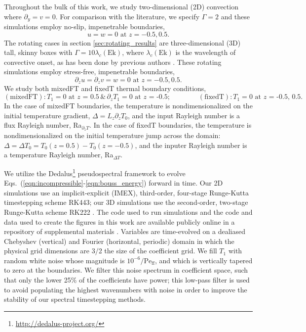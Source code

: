 \documentclass[aps, pre, onecolumn, nofootinbib, notitlepage, groupedaddress, amsfonts, amssymb, amsmath, longbibliography]{revtex4-1}
\newcommand{\Peff}{\ensuremath{\text{Pe}_{\text{ff}}}}
\begin{document}
Throughout the bulk of this work, we study two-dimensional (2D) convection where $\partial_y = v = 0$.
For comparison with the literature, we specify $\Gamma = 2$ and these simulations employ no-slip, impenetrable boundaries,
\begin{equation}
u = w = 0 \, \, \text{at}\,\,z = -0.5, 0.5.
\label{eqn:vel_bcs}
\end{equation}
The rotating cases in section \ref{sec:rotating_results} are three-dimensional (3D) tall, skinny boxes with $\Gamma = 10\lambda_c(\text{Ek})$, where $\lambda_c(\text{Ek})$ is the wavelength of convective onset, as has been done by previous authors \cite{stellmach&all2014}. 
These rotating simulations employ stress-free, impenetrable boundaries,
\begin{equation}
\partial_z u = \partial_z v = w = 0 \, \, \text{at}\,\,z = -0.5, 0.5.
\label{eqn:vel_bcs}
\end{equation}
We study both mixedFT and fixedT thermal boundary conditions,
\begin{equation}
(\text{mixedFT}): T_1 = 0 \text{ at $z$ = 0.5} \,\&\, \partial_z T_1 = 0 \text{ at $z$ = -0.5};\qquad\qquad
(\text{fixedT}): T_1 = 0 \text{ at $z$ = -0.5, 0.5}.
\end{equation}
In the case of mixedFT boundaries, the temperature is nondimensionalized on the initial temperature gradient, $\Delta = L_z \partial_z T_0$, and the input Rayleigh number is a flux Rayleigh number, Ra$_{\partial_z T}$.
In the case of fixedT boundaries, the temperature is nondimensionalized on the initial temperature jump across the domain: $\Delta = \Delta T_0 =  T_0(z=0.5)-T_0(z=-0.5)$, and the inputer Rayleigh number is a temperature Rayleigh number, Ra$_{\Delta T}$.

We utilize the Dedalus\footnote{\url{http://dedalus-project.org/}} pseudospectral framework \cite{burns&all2016, burns&all2019} to evolve Eqs.~(\ref{eqn:incompressible}-\ref{eqn:bouss_energy}) forward in time.
Our 2D simulations use an implicit-explicit (IMEX), third-order, four-stage Runge-Kutta timestepping scheme RK443; our 3D simulations use the second-order, two-stage Runge-Kutta scheme RK222 \cite{ascher&all1997}. 
The code used to run simulations and the code and data used to create the figures in this work are available publicly online in a repository of supplemental materials \cite{anders&all2020a_supp}.
Variables are time-evolved on a dealiased Chebyshev (vertical) and Fourier (horizontal, periodic) domain in which the physical grid dimensions are 3/2 the size of the coefficient grid.  
We fill $T_1$ with random white noise whose magnitude is $10^{-6}/\Peff$, and which is vertically tapered to zero at the boundaries.
We filter this noise spectrum in coefficient space, such that only the lower 25\% of the coefficients have power; this low-pass filter is used to avoid populating the highest wavenumbers with noise in order to improve the stability of our spectral timestepping methods.
\end{document}
